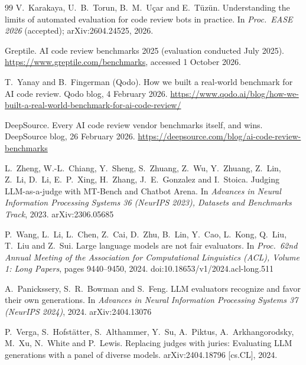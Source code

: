 \documentclass[11pt,a4paper]{article}
\begin{document}
\begin{thebibliography}{99}
V.~Karakaya, U.~B.~Torun, B.~M.~U\c{c}ar and E.~T\"uz\"un.
\newblock Understanding the limits of automated evaluation for code review
bots in practice.
\newblock In \emph{Proc.\ EASE 2026} (accepted); arXiv:2604.24525, 2026.

Greptile.
\newblock AI code review benchmarks 2025 (evaluation conducted July 2025).
\newblock \url{https://www.greptile.com/benchmarks}, accessed
1 October 2026.

T.~Yanay and B.~Fingerman (Qodo).
\newblock How we built a real-world benchmark for AI code review.
\newblock Qodo blog, 4 February 2026.
\newblock
\url{https://www.qodo.ai/blog/how-we-built-a-real-world-benchmark-for-ai-code-review/}

DeepSource.
\newblock Every AI code review vendor benchmarks itself, and wins.
\newblock DeepSource blog, 26 February 2026.
\newblock \url{https://deepsource.com/blog/ai-code-review-benchmarks}

L.~Zheng, W.-L.~Chiang, Y.~Sheng, S.~Zhuang, Z.~Wu, Y.~Zhuang, Z.~Lin,
Z.~Li, D.~Li, E.~P.~Xing, H.~Zhang, J.~E.~Gonzalez and I.~Stoica.
\newblock Judging LLM-as-a-judge with MT-Bench and Chatbot Arena.
\newblock In \emph{Advances in Neural Information Processing Systems 36
(NeurIPS 2023), Datasets and Benchmarks Track}, 2023.
\newblock arXiv:2306.05685

P.~Wang, L.~Li, L.~Chen, Z.~Cai, D.~Zhu, B.~Lin, Y.~Cao, L.~Kong, Q.~Liu,
T.~Liu and Z.~Sui.
\newblock Large language models are not fair evaluators.
\newblock In \emph{Proc.\ 62nd Annual Meeting of the Association for
Computational Linguistics (ACL), Volume 1: Long Papers}, pages 9440--9450,
2024.
\newblock doi:10.18653/v1/2024.acl-long.511

A.~Panickssery, S.~R.~Bowman and S.~Feng.
\newblock LLM evaluators recognize and favor their own generations.
\newblock In \emph{Advances in Neural Information Processing Systems 37
(NeurIPS 2024)}, 2024.
\newblock arXiv:2404.13076

P.~Verga, S.~Hofst\"atter, S.~Althammer, Y.~Su, A.~Piktus,
A.~Arkhangorodsky, M.~Xu, N.~White and P.~Lewis.
\newblock Replacing judges with juries: Evaluating LLM generations with a
panel of diverse models.
\newblock arXiv:2404.18796 [cs.CL], 2024.


\end{thebibliography}
\end{document}
